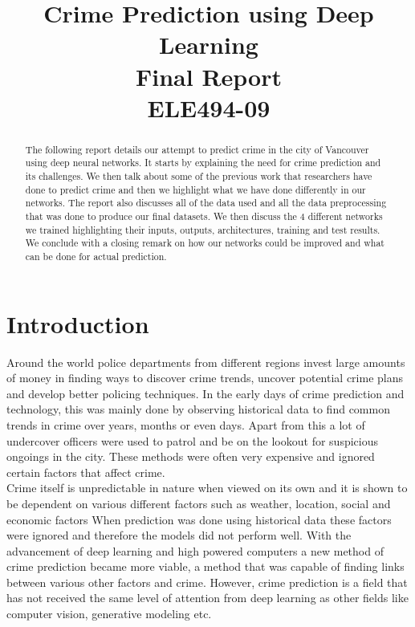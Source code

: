\documentclass[conference]{IEEEtran}
\begin{document}
\title{Crime Prediction using Deep Learning\\[0.3cm]
\large Final Report\\
ELE494-09}


\author{

}

\maketitle

\begin{abstract}
The following report details our attempt to predict crime in the city of Vancouver using deep
neural networks. It starts by explaining the need for crime prediction and its challenges. We then talk about some of the previous work that researchers have done to predict crime
and then we highlight what we have done differently in our networks. The report also discusses all of the
data used and all the data preprocessing that was done to produce our final datasets. We then discuss the
4 different networks we trained highlighting their inputs, outputs, architectures, training and test results.
We conclude with a closing remark on how our networks could be improved and what can be done for actual prediction.
\end{abstract}

\IEEEpeerreviewmaketitle


\section{Introduction}

Around the world police departments from different regions invest large amounts
of money in finding ways to discover crime trends, uncover potential crime plans and
develop better policing techniques. In the early days of crime prediction and technology,
this was mainly done by observing historical data to find common trends in crime over years,
months or even days. Apart from this a lot of undercover officers were used to patrol and be on
the lookout for suspicious ongoings in the city. These methods were often very expensive and ignored
certain factors that affect crime.\\

Crime itself is unpredictable in nature when viewed on its own and it is shown to be dependent
on various different factors such as weather, location, social and economic factors \cite{Carlen}
When prediction was done using historical data these factors were ignored and therefore the models
did not perform well. With the advancement of deep learning and high powered computers a new method of
crime prediction became more viable, a method that was capable of finding links between various other factors and crime.
However, crime prediction is a field that has not received the same level of attention from deep learning as other fields
like computer vision, generative modeling etc.\\
\end{document}
